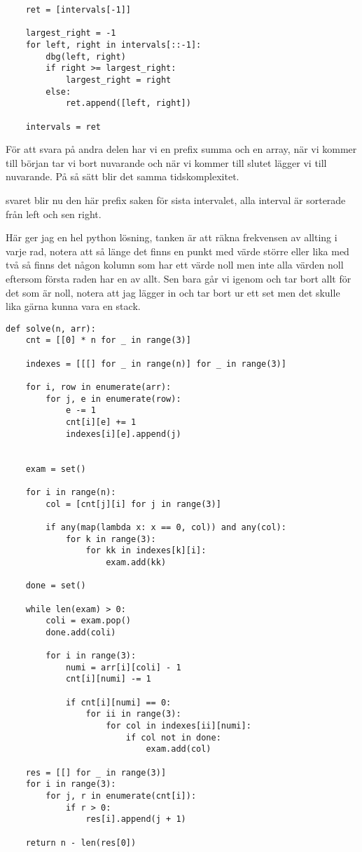 \documentclass[a4paper, 12pt]{article}
\newenvironment{problem}[2][Problem]{\begin{trivlist}
\item[\hskip \labelsep {\bfseries #1}\hskip \labelsep {\bfseries #2.}]}{\end{trivlist}}
\begin{document}
\begin{problem}{1}
\begin{verbatim}
    ret = [intervals[-1]]

    largest_right = -1
    for left, right in intervals[::-1]:
        dbg(left, right)
        if right >= largest_right:
            largest_right = right
        else:
            ret.append([left, right])

    intervals = ret
    \end{verbatim}

    För att svara på andra delen har vi en prefix summa och en array, när vi kommer till början tar vi bort nuvarande och när vi kommer till slutet lägger vi till nuvarande. På så sätt blir det samma tidskomplexitet.

    svaret blir nu den här prefix saken för sista intervalet, alla interval är sorterade från left och sen right.
\end{problem}

\newpage

\begin{problem}{2}
    Här ger jag en hel python lösning, tanken är att räkna frekvensen av allting i varje rad, notera att så länge det finns en punkt med värde större eller lika med två så finns det någon kolumn som har ett värde noll men inte alla värden noll eftersom första raden har en av allt. Sen bara går vi igenom och tar bort allt för det som är noll, notera att jag lägger in och tar bort ur ett set men det skulle lika gärna kunna vara en stack.
    \begin{verbatim}
def solve(n, arr):
    cnt = [[0] * n for _ in range(3)]

    indexes = [[[] for _ in range(n)] for _ in range(3)]

    for i, row in enumerate(arr):
        for j, e in enumerate(row):
            e -= 1
            cnt[i][e] += 1
            indexes[i][e].append(j)


    exam = set()

    for i in range(n):
        col = [cnt[j][i] for j in range(3)]

        if any(map(lambda x: x == 0, col)) and any(col):
            for k in range(3):
                for kk in indexes[k][i]:
                    exam.add(kk)

    done = set()

    while len(exam) > 0:
        coli = exam.pop()
        done.add(coli)

        for i in range(3):
            numi = arr[i][coli] - 1
            cnt[i][numi] -= 1

            if cnt[i][numi] == 0:
                for ii in range(3):
                    for col in indexes[ii][numi]:
                        if col not in done:
                            exam.add(col)

    res = [[] for _ in range(3)]
    for i in range(3):
        for j, r in enumerate(cnt[i]):
            if r > 0:
                res[i].append(j + 1)

    return n - len(res[0])

    \end{verbatim}
\end{problem}
\end{document}
